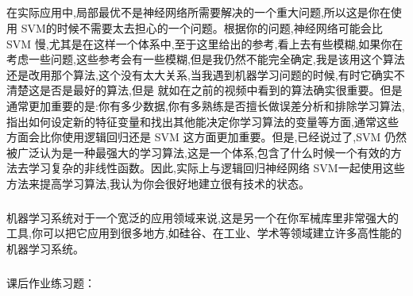 \documentclass{article}
\begin{document}
\begin{CJK}{UTF8}{gbsn}
\subparagraph{}
在实际应用中,局部最优不是神经网络所需要解决的一个重大问题,所以这是你在使用 SVM的时候不需要太去担心的一个问题。根据你的问题,神经网络可能会比 SVM 慢,尤其是在这样一个体系中,至于这里给出的参考,看上去有些模糊,如果你在考虑一些问题,这些参考会有一些模糊,但是我仍然不能完全确定,我是该用这个算法还是改用那个算法,这个没有太大关系,当我遇到机器学习问题的时候,有时它确实不清楚这是否是最好的算法,但是
就如在之前的视频中看到的算法确实很重要。但是通常更加重要的是:你有多少数据,你有多熟练是否擅长做误差分析和排除学习算法,指出如何设定新的特征变量和找出其他能决定你学习算法的变量等方面,通常这些方面会比你使用逻辑回归还是 SVM 这方面更加重要。但是,已经说过了,SVM 仍然被广泛认为是一种最强大的学习算法,这是一个体系,包含了什么时候一个有效的方法去学习复杂的非线性函数。因此,实际上与逻辑回归神经网络 SVM一起使用这些方法来提高学习算法,我认为你会很好地建立很有技术的状态。
\subparagraph{}
机器学习系统对于一个宽泛的应用领域来说,这是另一个在你军械库里非常强大的工具,你可以把它应用到很多地方,如硅谷、在工业、学术等领域建立许多高性能的机器学习系统。
\subparagraph{}
课后作业练习题：
\begin{figure}[H]
\label{fig:760}
\end{figure}
\begin{figure}[H]
\label{fig:761}
\end{figure}
\begin{figure}[H]
\label{fig:762}
\end{figure}
\begin{figure}[H]
\label{fig:763}
\end{figure}
\begin{figure}[H]
\label{fig:764}
\end{figure}
\begin{figure}[H]
\label{fig:765}
\end{figure}
\end{CJK}
\end{document}
